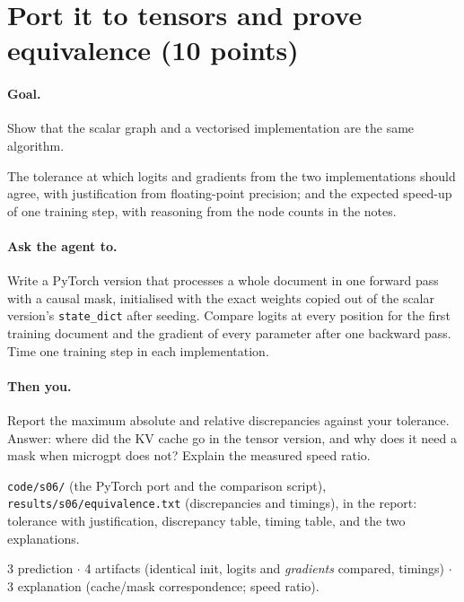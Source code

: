 \documentclass[11pt,letterpaper]{article}
\newcommand{\agent}[1]{\paragraph{Ask the agent to.} #1}
\newcommand{\you}[1]{\paragraph{Then you.} #1}
\newcommand{\goal}[1]{\paragraph{Goal.} #1}
\begin{document}
\section{Port it to tensors and prove equivalence \hfill (10 points)}
\goal{Show that the scalar graph and a vectorised implementation are the same algorithm.}
\begin{predict}
The tolerance at which logits and gradients from the two implementations should agree, with justification from floating-point precision; and the expected speed-up of one training step, with reasoning from the node counts in the notes.
\end{predict}
\agent{Write a PyTorch version that processes a whole document in one forward pass with a causal mask, initialised with the exact weights copied out of the scalar version's \texttt{state\_dict} after seeding. Compare logits at every position for the first training document and the gradient of every parameter after one backward pass. Time one training step in each implementation.}
\you{Report the maximum absolute and relative discrepancies against your tolerance. Answer: where did the KV cache go in the tensor version, and why does it need a mask when microgpt does not? Explain the measured speed ratio.}
\begin{deliver}
\texttt{code/s06/} (the PyTorch port and the comparison script), \texttt{results/s06/equivalence.txt} (discrepancies and timings), in the report: tolerance with justification, discrepancy table, timing table, and the two explanations.
\end{deliver}
\begin{rubric}3 prediction $\cdot$ 4 artifacts (identical init, logits and \emph{gradients} compared, timings) $\cdot$ 3 explanation (cache/mask correspondence; speed ratio).\end{rubric}

\end{document}
